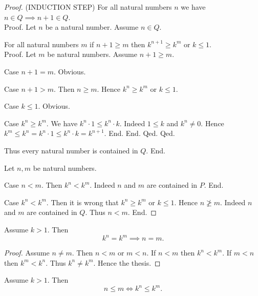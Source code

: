 \documentclass[../../natural-numbers.ftl.tex]{subfiles}
\begin{document}
\begin{forthel}
\begin{proof}
        (INDUCTION STEP) For all natural numbers $n$ we have $n \in Q \implies n + 1 \in Q$. \\
        Proof.
          Let $n$ be a natural number.
          Assume $n \in Q$.

          For all natural numbers $m$ if $n + 1 \geq m$ then $k^{n + 1} \geq k^{m}$ or $k \leq 1$. \\
          Proof.
            Let $m$ be natural numbers.
            Assume $n + 1 \geq m$.

            Case $n + 1 = m$. Obvious.

            Case $n + 1 > m$.
              Then $n \geq m$.
              Hence $k^{n} \geq k^{m}$ or $k \leq 1$.

              Case $k \leq 1$. Obvious.

              Case $k^{n} \geq k^{m}$.
                We have $k^{n} \cdot 1 \leq k^{n} \cdot k$.
                Indeed $1 \leq k$ and $k^{n} \neq 0$.
                Hence $k^{m} \leq k^{n} = k^{n} \cdot 1 \leq k^{n} \cdot k = k^{n + 1}$.
              End.
            End.
          Qed.
        Qed.

        Thus every natural number is contained in $Q$.
      End.


      Let $n,m$ be natural numbers.

      Case $n < m$.
        Then $k^{n} < k^{m}$.
        Indeed $n$ and $m$ are contained in $P$.
      End.

      Case $k^{n} < k^{m}$.
        Then it is wrong that $k^{n} \geq k^{m}$ or $k \leq 1$.
        Hence $n \ngeq m$.
        Indeed $n$ and $m$ are contained in $Q$.
        Thus $n < m$.
      End.
    \end{proof}


    \begin{corollary}\label{Arithmetic_02_04_837306}
      Assume $k > 1$.
      Then \[ k^{n} = k^{m} \implies n = m. \]
    \end{corollary}
    \begin{proof}
      Assume $n \neq m$.
      Then $n < m$ or $m < n$.
      If $n < m$ then $k^{n} < k^{m}$.
      If $m < n$ then $k^{m} < k^{n}$.
      Thus $k^{n} \neq k^{m}$.
      Hence the thesis.
    \end{proof}


    \begin{corollary}\label{Arithmetic_02_04_734298}
      Assume $k > 1$.
      Then \[ n \leq m \iff k^{n} \leq k^{m}. \]
    \end{corollary}
  \end{forthel}
\end{document}
